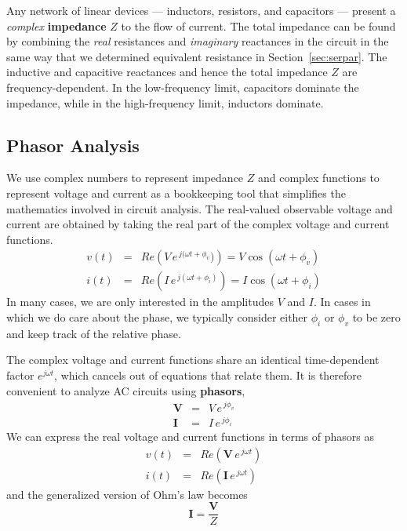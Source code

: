 \documentclass[11pt]{article}
\begin{document}
Any network of linear devices --- inductors, resistors, and capacitors
--- present a \emph{complex} \textbf{impedance} $Z$ to the flow of
current. The total impedance can be found by combining the \emph{real}
resistances and \emph{imaginary} reactances in the circuit in the same
way that we determined equivalent resistance in
Section~\ref{sec:serpar}. The inductive and capacitive reactances and
hence the total impedance $Z$ are frequency-dependent. In the
low-frequency limit, capacitors dominate the impedance, while in the
high-frequency limit, inductors dominate.

\subsection{Phasor Analysis}

We use complex numbers to represent impedance $Z$ and complex
functions to represent voltage and current as a bookkeeping tool that
simplifies the mathematics involved in circuit analysis. The
real-valued observable voltage and current are obtained by taking the
real part of the complex voltage and current functions.
\begin{eqnarray}
  v(t) &=& Re \left(V \, e^{\,j(\omega t + \phi_v}) \right) = V
  \cos(\omega t + \phi_v)\\ \nonumber i(t) &=& Re \left(I \,
  e^{\,j(\omega t + \phi_i)} \right) = I \cos(\omega t + \phi_i)
\end{eqnarray}
In many cases, we are only interested in the amplitudes $V$ and
$I$. In cases in which we do care about the phase, we typically
consider either $\phi_i$ or $\phi_v$ to be zero and keep track of the
relative phase.

The complex voltage and current functions share an identical
time-dependent factor $e^{j \omega t}$, which cancels out of equations
that relate them. It is therefore convenient to analyze AC circuits
using \textbf{phasors},
\begin{eqnarray}
  \mathbf{V} &=& V \, e^{\,j \phi_v}\\ \nonumber \mathbf{I} &=& I \,
  e^{\,j \phi_i}
\end{eqnarray}
We can express the real voltage and current functions in terms of
phasors as
\begin{eqnarray}
  v(t) &=& Re(\mathbf{V} \, e^{\,j\omega t})\\ \nonumber i(t) &=&
  Re(\mathbf{I} \, e^{\,j\omega t})
\end{eqnarray}
and the generalized version of Ohm's law becomes
\begin{equation}
  \mathbf{I} = \frac{\mathbf{V}}{Z}
  \label{eq:genohmphasor}
\end{equation}
\end{document}
